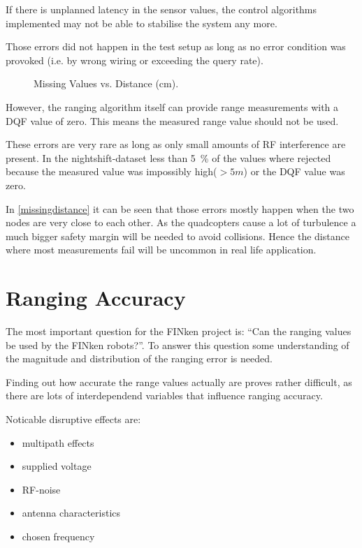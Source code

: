 If there is unplanned latency in the sensor values, the control algorithms implemented may not be able to stabilise the system any more.

Those errors did not happen in the test setup as long as no error condition was provoked (i.e. by wrong wiring or exceeding the query rate).

\begin{figure}[h]
	\centering
	
	\caption[ Missing Values vs. Real Distance ]{ Missing Values vs. Distance (cm).}
	\label{missingdistance}
\end{figure}

However, the ranging algorithm itself can provide range measurements with a DQF value of zero.
This means the measured range value should not be used.

These errors are very rare as long as only small amounts of RF interference are present.
In the nightshift-dataset less than \SI{5}{\percent} of the values where rejected because the measured value was impossibly high($> 5m$) or the DQF value was zero.

In \autoref{missingdistance} it can be seen that those errors mostly happen when the two nodes are very close to each other.
As the quadcopters cause a lot of turbulence a much bigger safety margin will be needed to avoid collisions.
Hence the distance where most measurements fail will be uncommon in real life application.


\section{Ranging Accuracy}

The most important question for the FINken project is: \enquote{Can the ranging values be used by the FINken robots?}.
To answer this question some understanding of the magnitude and distribution of the ranging error is needed.

Finding out how accurate the range values actually are proves rather difficult, as there are lots of interdependend variables that influence ranging accuracy.

Noticable disruptive effects are:
\begin{itemize}
	\item multipath effects
	\item supplied voltage
	\item RF-noise
	\item	antenna characteristics
	\item chosen frequency
\end{itemize}

